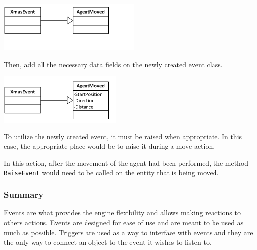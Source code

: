 \includegraphics{XmasEventCreationStepOne}

Then, add all the necessary data fields on the newly created event
class.

\includegraphics{XmasEventCreationStepTwo}

To utilize the newly created event, it must be raised when appropriate.
In this case, the appropriate place would be to raise it during a
move action.

In this action, after the movement of the agent had been performed,
the method \texttt{RaiseEvent} would need to be called on the entity
that is being moved.


\subsubsection*{Summary}

Events are what provides the engine flexibility and allows making
reactions to others actions. Events are designed for ease of use and
are meant to be used as much as possible. Triggers are used as a way
to interface with events and they are the only way to connect an object
to the event it wishes to listen to.
